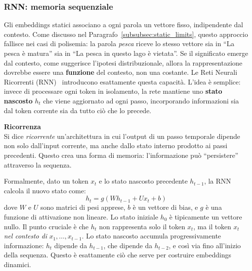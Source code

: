 \subsubsection{RNN: memoria sequenziale}
\label{subsubsec:rnn}
Gli embeddings statici associano a ogni parola un vettore fisso, indipendente dal contesto. Come discusso nel Paragrafo~\ref{subsubsec:static_limits}, questo approccio fallisce nei casi di polisemia: la parola \textit{pesca} riceve lo stesso vettore sia in ``La pesca è matura'' sia in ``La pesca in questo lago è vietata''. Se il significato emerge dal contesto, come suggerisce l'ipotesi distribuzionale, allora la rappresentazione dovrebbe essere una \textbf{funzione} del contesto, non una costante.
Le Reti Neurali Ricorrenti (RNN)~\parencite{elman1990finding} introducono esattamente questa capacità. L'idea è semplice: invece di processare ogni token in isolamento, la rete mantiene uno \textbf{stato nascosto} $h_t$ che viene aggiornato ad ogni passo, incorporando informazioni sia dal token corrente sia da tutto ciò che lo precede.
\begin{notebox}
\textbf{Ricorrenza}\\
Si dice \textit{ricorrente} un'architettura in cui l'output di un passo temporale dipende non solo dall'input corrente, ma anche dallo stato interno prodotto ai passi precedenti. Questo crea una forma di memoria: l'informazione può ``persistere'' attraverso la sequenza.
\end{notebox}
Formalmente, dato un token $x_t$ e lo stato nascosto precedente $h_{t-1}$, la RNN calcola il nuovo stato come:
\begin{equation}
h_t = g(Wh_{t-1} + Ux_t + b)
\end{equation}
dove $W$ e $U$ sono matrici di pesi apprese, $b$ è un vettore di bias, e $g$ è una funzione di attivazione non lineare. Lo stato iniziale $h_0$ è tipicamente un vettore nullo.
Il punto cruciale è che $h_t$ non rappresenta solo il token $x_t$, ma il token $x_t$ \textit{nel contesto di} $x_1, \dots, x_{t-1}$. Lo stato nascosto accumula progressivamente informazione: $h_t$ dipende da $h_{t-1}$, che dipende da $h_{t-2}$, e così via fino all'inizio della sequenza. Questo è esattamente ciò che serve per costruire embeddings dinamici.

